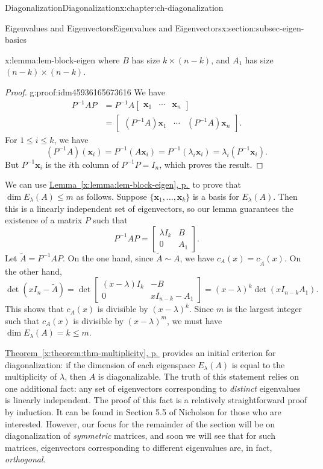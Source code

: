 \documentclass[oneside,10pt,]{book}
\newcommand{\xreffont}{\relax}
\numberwithin{equation}{section}
\newcommand{\bbm}{\begin{bmatrix}}
\newcommand{\ebm}{\end{bmatrix}}
\newcommand{\xx}{\mathbf{x}}
\newcommand{\amp}{&}
\begin{document}
\begin{chapterptx}{Diagonalization}{}{Diagonalization}{}{}{x:chapter:ch-diagonalization}
\begin{sectionptx}{Eigenvalues and Eigenvectors}{}{Eigenvalues and Eigenvectors}{}{}{x:section:subsec-eigen-basics}
\begin{lemma}{}{}{x:lemma:lem-block-eigen}
where \(B\) has size \(k\times (n-k)\), and \(A_1\) has size \((n-k)\times (n-k)\).%
\end{lemma}
\begin{proof}{}{g:proof:idm45936165673616}
We have%
\begin{align*}
P^{-1}AP \amp = P^{-1}A\bbm \xx_1\amp \cdots \amp \xx_n\ebm\\
\amp =\bbm (P^{-1}A)\xx_1\amp \cdots \amp (P^{-1}A)\xx_n\ebm\text{.}
\end{align*}
For \(1\leq i\leq k\), we have%
\begin{equation*}
(P^{-1}A)(\xx_i) = P^{-1}(A\xx_i) = P^{-1}(\lambda_i\xx_i)=\lambda_i(P^{-1}\xx_i)\text{.}
\end{equation*}
But \(P^{-1}\xx_i\) is the \(i\)th column of \(P^{-1}P = I_n\), which proves the result.%
\end{proof}
We can use \hyperref[x:lemma:lem-block-eigen]{Lemma~{\xreffont\ref{x:lemma:lem-block-eigen}}, p.\,\pageref{x:lemma:lem-block-eigen}} to prove that \(\dim E_\lambda(A)\leq m\) as follows. Suppose \(\{\xx_1,\ldots, \xx_k\}\) is a basis for \(E_\lambda(A)\). Then this is a linearly independent set of eigenvectors, so our lemma guarantees the existence of a matrix \(P\) such that%
\begin{equation*}
P^{-1}AP = \bbm \lambda I_k \amp B\\0\amp A_1\ebm\text{.}
\end{equation*}
Let \(\tilde{A}=P^{-1}AP\). On the one hand, since \(\tilde{A}\sim A\), we have \(c_A(x)=c_{\tilde{A}}(x)\). On the other hand,%
\begin{equation*}
\det(xI_n-\tilde{A}) = \det\bbm (x-\lambda)I_k \amp -B\\0 \amp xI_{n-k}-A_1\ebm = (x-\lambda)^k\det(xI_{n-k}A_1)\text{.}
\end{equation*}
This shows that \(c_A(x)\) is divisible by \((x-\lambda)^k\). Since \(m\) is the largest integer such that \(c_A(x)\) is divisible by \((x-\lambda)^m\), we must have \(\dim E_\lambda(A)=k\leq m\).%
\par
\hyperref[x:theorem:thm-multiplicity]{Theorem~{\xreffont\ref{x:theorem:thm-multiplicity}}, p.\,\pageref{x:theorem:thm-multiplicity}} provides an initial criterion for diagonalization: if the dimension of each eigenspace \(E_\lambda(A)\) is equal to the multiplicity of \(\lambda\), then \(A\) is diagonalizable. The truth of this statement relies on one additional fact: any set of eigenvectors corresponding to \emph{distinct} eigenvalues is linearly independent. The proof of this fact is a relatively straightforward proof by induction. It can be found in Section 5.5 of Nicholson for those who are interested. However, our focus for the remainder of the section will be on diagonalization of \emph{symmetric} matrices, and soon we will see that for such matrices, eigenvectors corresponding to different eigenvalues are, in fact, \emph{orthogonal}.%

\end{sectionptx}
\end{chapterptx}
\end{document}

